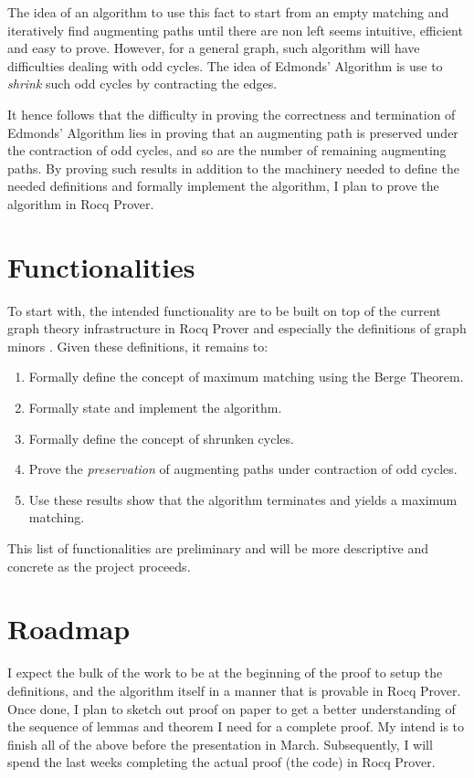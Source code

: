 \documentclass[acmsmall, screen, nonacm]{acmart}
\begin{document}
The idea of an algorithm to use this fact to start from an empty matching and iteratively find augmenting paths until there are non left seems intuitive, efficient and easy to prove. However, for a general graph, such algorithm will have difficulties dealing with odd cycles. The idea of Edmonds' Algorithm is use to \textit{shrink} such odd cycles by contracting the edges. 

It hence follows that the difficulty in proving the correctness and termination of Edmonds' Algorithm lies in proving that an augmenting path is preserved under the contraction of odd cycles, and so are the number of remaining augmenting paths. By proving such results in addition to the machinery needed to define the needed definitions and formally implement the algorithm, I plan to prove the algorithm in Rocq Prover.

\section{Functionalities}

To start with, the intended functionality are to be built on top of the current graph theory infrastructure in Rocq Prover and especially the definitions of graph minors \cite{CoqGraph}. Given these definitions, it remains to:
\begin{enumerate}
	\item Formally define the concept of maximum matching using the Berge Theorem.
	\item Formally state and implement the algorithm.
	\item Formally define the concept of shrunken cycles.
	\item Prove the \textit{preservation} of augmenting paths under contraction of odd cycles.
	\item Use these results show that the algorithm terminates and yields a maximum matching.
\end{enumerate}

This list of functionalities are preliminary and will be more descriptive and concrete as the project proceeds.

\section{Roadmap}

I expect the bulk of the work to be at the beginning of the proof to setup the definitions, and the algorithm itself in a manner that is provable in Rocq Prover. Once done, I plan to sketch out proof on paper to get a better understanding of the sequence of lemmas and theorem I need for a complete proof. My intend is to finish all of the above before the presentation in March. Subsequently, I will spend the last weeks completing the actual proof (the code) in Rocq Prover. 
\end{document}
